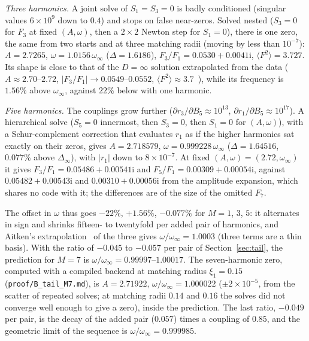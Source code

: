 \documentclass{amsart}
\numberwithin{equation}{section}
\theoremstyle{plain}
\theoremstyle{definition}
\theoremstyle{remark}
\newcommand{\Dinf}{\Delta_\infty}
\newcommand{\winf}{\omega_\infty}
\newcommand{\iu}{\mathrm{i}}
\newcommand{\repo}[1]{\texttt{#1}}
\begin{document}
\emph{Three harmonics.} A joint solve of $S_1 = S_3 = 0$ is badly conditioned (singular values $6\times10^9$ down to $0.4$) and
stops on false near-zeros. Solved nested ($S_3 = 0$ for $F_3$ at fixed $(A, \omega)$, then a $2\times2$ Newton step for $S_1 = 0$), there
is one zero, the same from two starts and at three matching radii (moving by less than $10^{-7}$): $A = 2.7265$, $\omega = 1.0156\,\winf$ ($\Delta = 1.6186$), $F_3/F_1 = 0.0530 + 0.0041\iu$,
$\langle F^2\rangle = 3.727$. Its shape is close to that of the $D = \infty$ solution extrapolated from the data
($A \approx 2.70$--$2.72$, $|F_3/F_1| \to 0.0549$--$0.0552$, $\langle F^2\rangle \approx 3.7$~\cite{companion}), while its
frequency is $1.56\%$ above $\winf$, against $22\%$ below with one harmonic.

\emph{Five harmonics.} The couplings grow further ($\partial r_3/\partial B_5 \approx 10^{13}$, $\partial r_1/\partial B_5 \approx 10^{17}$). A hierarchical
solve ($S_5 = 0$ innermost, then $S_3 = 0$, then $S_1 = 0$ for $(A, \omega)$), with a Schur-complement correction that evaluates $r_1$
as if the higher harmonics sat exactly on their zeros, gives $A = 2.718579$, $\omega = 0.999228\,\winf$ ($\Delta = 1.64516$, $0.077\%$
above $\Dinf$), with $|r_1|$ down to $8\times10^{-7}$. At fixed $(A, \omega) = (2.72, \winf)$ it gives $F_3/F_1 = 0.05486 + 0.00541\iu$ and
$F_5/F_1 = 0.00309 + 0.00054\iu$, against $0.05482 + 0.00543\iu$ and $0.00310 + 0.00056\iu$ from the amplitude expansion, which shares
no code with it; the differences are of the size of the omitted $F_7$.

The offset in $\omega$ thus goes $-22\%$, $+1.56\%$, $-0.077\%$ for $M = 1$, $3$, $5$: it alternates in sign and shrinks fifteen- to
twentyfold per added pair of harmonics, and Aitken's extrapolation~\cite{Aitken1927} of the three gives $\omega/\winf = 1.0003$ (three terms are a thin
basis). With the ratio of $-0.045$ to $-0.057$ per pair of Section~\ref{sec:tail}, the prediction for $M = 7$ is
$\omega/\winf = 0.99997$--$1.00017$. The seven-harmonic zero, computed with a compiled backend at matching radius
$\xi_1 = 0.15$ (\repo{proof/B\_tail\_M7.md}), is $A = 2.71922$, $\omega/\winf = 1.000022$ ($\pm2\times10^{-5}$, from the
scatter of repeated solves; at matching radii $0.14$ and $0.16$ the solves did not converge well enough to give a zero), inside the prediction. The last ratio, $-0.049$ per pair,
is the decay of the added pair ($0.057$) times a coupling of $0.85$, and the geometric limit of the sequence is
$\omega/\winf = 0.999985$.
\end{document}
